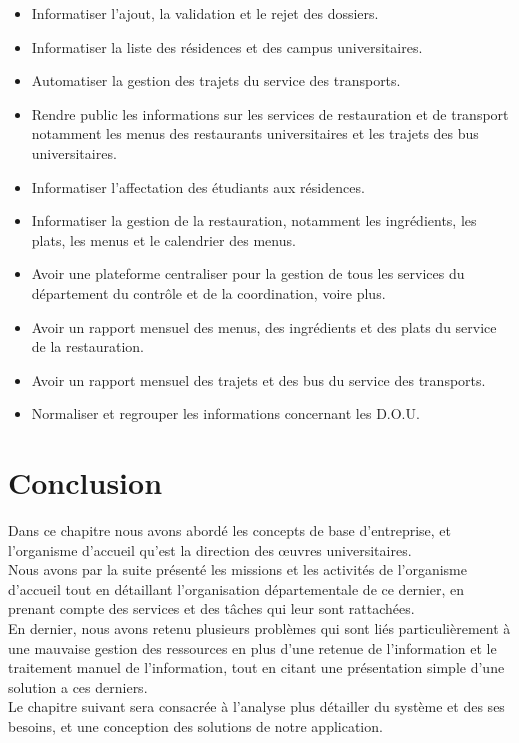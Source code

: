 \begin{itemize}
    \item Informatiser l'ajout, la validation et le rejet des dossiers.
    \item Informatiser la liste des résidences et des campus universitaires.
    \item Automatiser la gestion des trajets du service des transports.
    \item Rendre public les informations sur les services de restauration et de transport notamment les menus des restaurants universitaires et les trajets des bus universitaires. 
    \item Informatiser l'affectation des étudiants aux résidences.
    \item Informatiser la gestion de la restauration, notamment les ingrédients, les plats, les menus et le calendrier des menus.
    \item Avoir une plateforme centraliser pour la gestion de tous les services du département du contrôle et de la coordination, voire plus.
    \item Avoir un rapport mensuel des menus, des ingrédients et des plats du service de la restauration.
    \item Avoir un rapport mensuel des trajets et des bus du service des transports.
    \item Normaliser et regrouper les informations concernant les \acs{D.O.U}.\\
\end{itemize}

\section{Conclusion}
Dans ce chapitre nous avons abordé les concepts de base d'entreprise, et l'organisme d'accueil qu'est la direction des œuvres universitaires.\\

Nous avons par la suite présenté les missions et les activités de l'organisme d'accueil tout en détaillant l'organisation départementale de ce dernier, en prenant compte des services et des tâches qui leur sont rattachées.\\

En dernier, nous avons retenu plusieurs problèmes qui sont liés particulièrement à une mauvaise gestion des ressources en plus d’une retenue de l’information et le traitement manuel de l'information, tout en citant une présentation simple d'une solution a ces derniers.\\

Le chapitre suivant sera consacrée à l'analyse plus détailler du système et des ses besoins, et une conception des solutions de notre application.

\newpage

\leftskip=0cm
\renewcommand{\bibname}{Référence bibliographique et webographique du chapitre 2}
	
